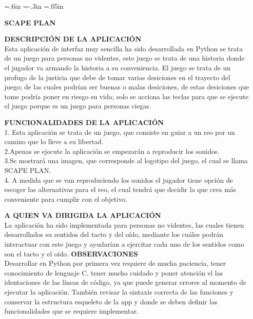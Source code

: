 {\leftskip=.6in  \parindent=-.3in  \parskip=.05in

\bigskip

\centerline {\namefont \LARGE \bf SCAPE PLAN}
\bigskip
\bigskip
\bigskip

{\bf DESCRIPCI\'ON DE LA APLICACI\'ON}
\bigskip
\\Esta aplicaci\'on de interfaz muy sencilla ha sido desarrollada en Python se trata de un juego para personas no videntes, este juego se trata de una historia donde el jugador va armando la historia a su conveniencia. El juego se trata de un profugo de la justicia que debe de tomar varias desiciones en el trayecto del juego; de las cuales podr\'ian ser buenas o malas desiciones, de estas desiciones que tome podr\'ia poner en riesgo su vida; solo se acciona las teclas para que se ejecute el juego porque es un juego para personas ciegas.
\bigskip
\bigskip

{\bf FUNCIONALIDADES DE LA APLICACI\'ON}
\bigskip
\\1. Esta aplicaci\'on se trata de un juego, que consiste en guiar a un reo por un camino que lo lleve a su libertad.\\

2.Apenas se ejecute la aplicaci\'on se empezar\'an a reproducir los sonidos.\\

3.Se mostrar\'a una imagen, que corresponde al logotipo del juego, el cual se llama SCAPE PLAN.\\

4. A medida que se van reproduciendo los sonidos el jugador tiene opción de escoger las alternativas para el reo, el cual tendr\'a que decidir la que crea m\'as conveniente para cumplir con el objetivo.\\

\bigskip
\bigskip

{\bf A QUIEN VA DIRIGIDA LA APLICACI\'ON}
\bigskip
\\La aplicaci\'on ha sido implementada para personas no videntes, las cuales tienen desarrollados su sentidos del tacto y del o\'ido, mediante los cu\'ales podr\'an interactuar con este juego y ayudar\'ian a ejercitar cada uno de los sentidos como son el tacto y el o\'ido. 
\bigskip
\bigskip
\newpage
{\bf OBSERVACIONES}
\bigskip
\\Desarrollar en Python por primera vez requiere de mucha paciencia, tener conocimiento de lenguaje C, tener mucho cuidado y poner atenci\'on el las identaciones de las l\'ineas de c\'odigo, ya que puede generar errores al momento de ejecutar la aplicaci\'on. Tambi\'en revisar la sintaxis correcta de las funciones y conservar la estructura esqueleto de la app y donde se deben definir las funcionalidades que se requiere implementar.   
\bigskip
\bigskip


}
